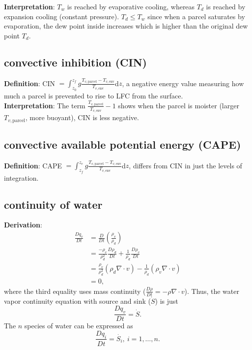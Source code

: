 {\bf Interpretation}: $T_w$ is reached by evaporative cooling, whereas $T_d$ is
reached by expansion cooling (constant pressure). $T_d \le T_w$ since when a parcel saturates by
evaporation, the dew point inside increases which is higher than the original dew point $T_d$.

\subsection{convective inhibition (CIN)}
{\bf Definition}: 
CIN $=\int_{z_0}^{z_f} g \frac{T_{v,\text{parcel}} - T_{v,\text{env}}}{T_{v,\text{env}}} $d$z$, 
a negative energy value measuring how much a parcel is prevented to rise to LFC from the surface. \\

{\bf Interpretation}: The term $\frac{T_{v,\text{parcel}}}{T_{v,\text{env}}} -
1$ shows when the parcel is moister (larger $T_{v,\text{parcel}}$, more buoyant), CIN is less negative.

\subsection{convective available potential energy (CAPE)}
{\bf Definition}: 
CAPE $=\int_{z_f}^{z_e} g \frac{T_{v,\text{parcel}} - T_{v,\text{env}}}{T_{v,\text{env}}} $d$z$,
differs from CIN in just the levels of integration.

\subsection{continuity of water}
{\bf Derivation}: 
\begin{equation}
\begin{aligned}
   \frac{D q_v}{D t} & = \frac{D}{D t} (\frac{\rho_v}{\rho_d}) \\
        & = \frac{-\rho_v}{\rho_d^2} \frac{D \rho_d}{D t} + \frac{1}{\rho_d}\frac{D \rho_v}{D t} \\
        & = \frac{\rho_v}{\rho_d^2}(\rho_d \nabla \cdot v) - \frac{1}{\rho_d}(\rho_v \nabla \cdot v) \\
        & = 0,
\end{aligned}
\end{equation}
where the third equality uses mass continuity ($\frac{D \rho}{D t} = -\rho \nabla\cdot v$). Thus,
the water vapor continuity equation with source and sink ($\dot{S}$) is just
\begin{equation}
   \frac{D q_v}{D t} = \dot{S}.
\end{equation}
The $n$ species of water can be expressed as
\begin{equation}
   \boxed{\frac{D q_i}{D t} = \dot{S_i}, \ i=1,\dotsc,n}.
\end{equation}



